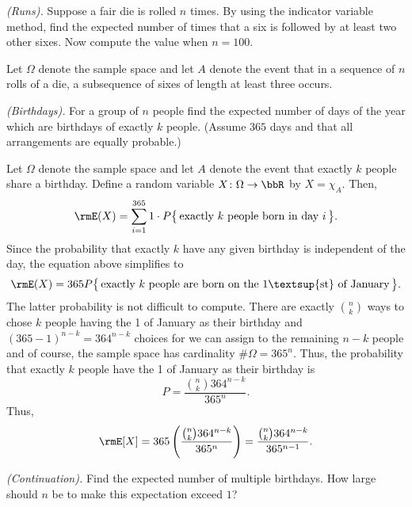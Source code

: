 \begin{problem}[Handout 6, \# 9]
  \emph{(Runs).} Suppose a fair die is rolled \(n\) times. By using the
  indicator variable method, find the expected number of times that a six
  is followed by at least two other sixes. Now compute the value when
  \(n=100\).
\end{problem}
\begin{solution}
  Let \(\Omega\) denote the sample space and let \(A\) denote the event
  that in a sequence of \(n\) rolls of a die, a subsequence of sixes of
  length at least three occurs.
\end{solution}
\newpage

\begin{problem}[Handout 6, \# 10]
  \emph{(Birthdays).} For a group of \(n\) people find the expected number
  of days of the year which are birthdays of exactly \(k\) people. (Assume
  \(365\) days and that all arrangements are equally probable.)
\end{problem}
\begin{solution}
  Let \(\Omega\) denote the sample space and let \(A\) denote the event
  that exactly \(k\) people share a birthday. Define a random variable
  \(X\colon\Omega\to\bbR\) by \(X=\chi_A\). Then,
  \[
    \rmE(X)=\sum_{i=1}^{365} 1\cdot P\bigl\{\,\text{exactly \(k\) people
      born in day \(i\)}\,\bigr\}.
  \]
  Since the probability that exactly \(k\) have any given birthday is
  independent of the day, the equation above simplifies to
  \[
    \rmE(X)=365 P\bigl\{\,\text{exactly \(k\) people are born on the
      1\textsup{st} of January}\,\bigr\}.
  \]
  The latter probability is not difficult to compute. There are exactly
  \(\binom{n}{k}\) ways to chose \(k\) people having the 1 of
  January as their birthday and \((365-1)^{n-k}=364^{n-k}\) choices for we
  can assign to the remaining \(n-k\) people and of course, the sample
  space has cardinality \(\#\Omega=365^n\). Thus, the probability that
  exactly \(k\) people have the 1 of January as their birthday
  is
  \[
    P=\frac{\binom{n}{k}364^{n-k}}{365^n}.
  \]
  Thus,
  \[
    \rmE[X]
    =365\left(\frac{\binom{n}{k}364^{n-k}}{365^n}\right)
    =\frac{\binom{n}{k}364^{n-k}}{365^{n-1}}.
  \]
\end{solution}
\newpage

\begin{problem}[Handout 6, \# 11]
  \emph{(Continuation).} Find the expected number of multiple
  birthdays. How large should \(n\) be to make this expectation exceed
  \(1\)?
\end{problem}
\begin{solution}

\end{solution}
\newpage

